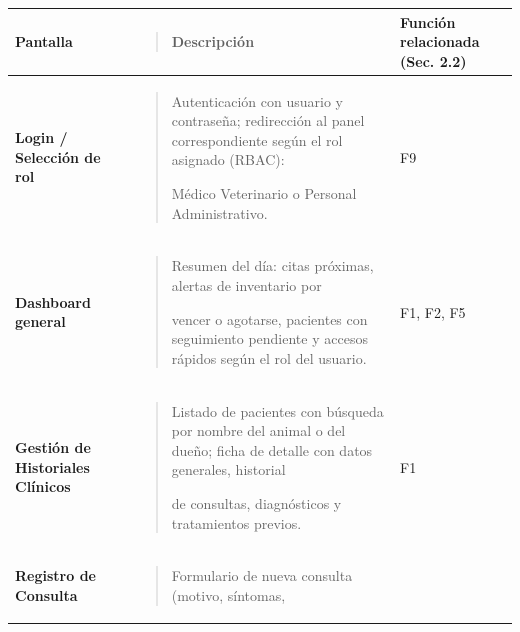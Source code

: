 \documentclass[
]{article}
\newcounter{none} %
\begin{document}
{\def\LTcaptype{none} %
\begin{longtable}[]{@{}
  >{\raggedright\arraybackslash}p{}
  >{\raggedright\arraybackslash}p{}
  >{\raggedright\arraybackslash}p{}@{}}
\toprule\noalign{}
\begin{minipage}[b]{\linewidth}\raggedright
\textbf{Pantalla}
\end{minipage} & \begin{minipage}[b]{\linewidth}\raggedright
\begin{quote}
\textbf{Descripción}
\end{quote}
\end{minipage} & \begin{minipage}[b]{\linewidth}\raggedright
\textbf{Función relacionada (Sec. 2.2)}
\end{minipage} \\
\midrule\noalign{}
\endhead
\bottomrule\noalign{}
\endlastfoot
\textbf{Login / Selección de rol} &
\begin{minipage}[t]{\linewidth}\raggedright
\begin{quote}
Autenticación con usuario y contraseña; redirección al panel
correspondiente según el rol asignado (RBAC):

Médico Veterinario o Personal Administrativo.
\end{quote}
\end{minipage} & F9 \\
\textbf{Dashboard general} & \begin{minipage}[t]{\linewidth}\raggedright
\begin{quote}
Resumen del día: citas próximas, alertas de inventario por

vencer o agotarse, pacientes con seguimiento pendiente y accesos rápidos
según el rol del usuario.
\end{quote}
\end{minipage} & F1, F2, F5 \\
\textbf{Gestión de Historiales Clínicos} &
\begin{minipage}[t]{\linewidth}\raggedright
\begin{quote}
Listado de pacientes con búsqueda por nombre del animal o del dueño;
ficha de detalle con datos generales, historial

de consultas, diagnósticos y tratamientos previos.
\end{quote}
\end{minipage} & F1 \\
\textbf{Registro de Consulta} &
\begin{minipage}[t]{\linewidth}\raggedright
\begin{quote}
Formulario de nueva consulta (motivo, síntomas,


\end{quote}
\end{minipage}
\end{longtable}}
\end{document}
